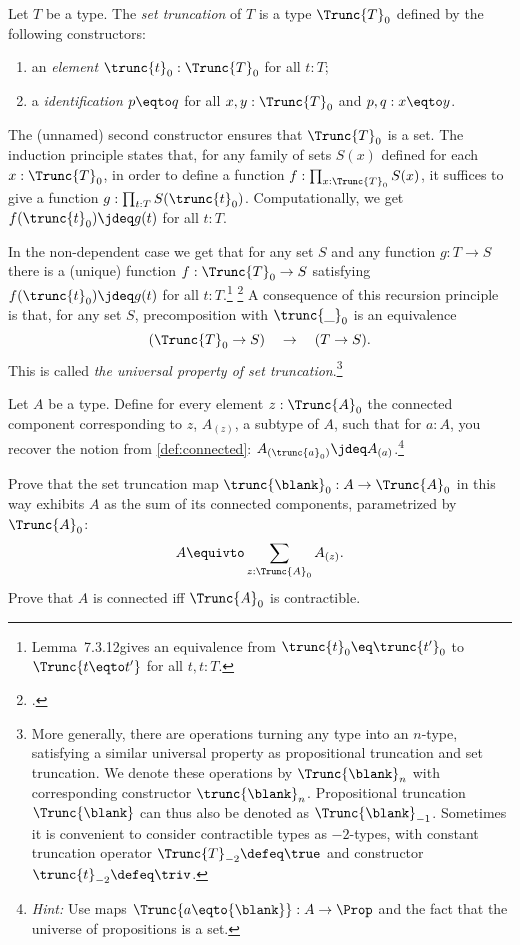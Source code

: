 \begin{definition}\label{def:set-truncation}
Let $T$ be a type. The \emph{set truncation} of $T$
is a type  $\Trunc{T}_0$ defined by the following constructors:
\begin{enumerate}
\item an \emph{element} $\trunc{t}_0 : \Trunc{T}_0$ for all $t:T$;
\item a \emph{identification} $p \eqto q$ for all $x,y:\Trunc{T}_0$ and $p,q: x \eqto y$.
\end{enumerate}
The (unnamed) second constructor ensures that $\Trunc{T}_0$ is a
set. The induction principle states that,
for any family of sets $S(x)$ defined for each $x:\Trunc{T}_0$,
in order to define a function $f:\prod_{x:\Trunc{T}_0} S(x)$,
it suffices to give a function $g: \prod_{t:T} S(\trunc{t}_0)$.
Computationally, we get $f(\trunc{t}_0)\jdeq g(t)$ for all $t:T$.
\end{definition}

In the non-dependent case we get that for any set $S$ and
any function $g: T\to S$ there is a (unique) function $f:\Trunc{T}_0\to S$
satisfying $f(\trunc{t}_0)\jdeq g(t)$ for all $t:T$.\footnote{%
Lemma~7.3.12\footnotemark gives an equivalence from
$\trunc{t}_0 \eq \trunc{t'}_0$ to $\Trunc{t \eqto t'}$ for all $t,t:T$.}%
\footcitetext{hottbook}
A consequence of this recursion principle is that,
for any set $S$, precomposition with $\trunc{\_}_0$ is an equivalence
\[
(\Trunc{T}_0 \to S) \quad \to \quad (T \to S).
\]
This is called \emph{the universal property of set truncation}.\footnote{%
More generally, there are operations turning any type into an $n$-type,
satisfying a similar universal property as propositional truncation
and set truncation. We denote these operations
by $\Trunc{\blank}_n$ with corresponding constructor $\trunc{\blank}_n$.
Propositional truncation $\Trunc{\blank}$ can thus also be denoted as
$\Trunc{\blank}_{-1}$. Sometimes it is convenient to consider
contractible types as $-2$-types, with constant truncation operator
$\Trunc{T}_{-2}\defeq\true$ and
constructor $\trunc{t}_{-2}\defeq\triv$.
}%

\begin{xca}\label{xca:sum-of-conn-components}
  Let $A$ be a type. Define for every element $z : \Trunc{A}_0$
  the connected component corresponding to $z$, $A_{(z)}$,
  a subtype of $A$, such that for $a:A$, you recover the notion from
  \cref{def:connected}: $A_{(\trunc{a}_0)} \jdeq A_{(a)}$.\footnote{%
    \emph{Hint:} Use maps $\Trunc{a \eqto {\blank}} : A \to \Prop$
    and the fact that the universe of propositions
    is a set.}

  Prove that the set truncation map $\trunc{\blank}_0 : A \to \Trunc{A}_0$
  in this way exhibits $A$ as the sum of its connected components,
  parametrized by $\Trunc{A}_0$:
  \[
    A \equivto \sum_{z : \Trunc{A}_0} A_{(z)}.
  \]
  Prove that $A$ is connected iff $\Trunc{A}_0$ is contractible.
\end{xca}

